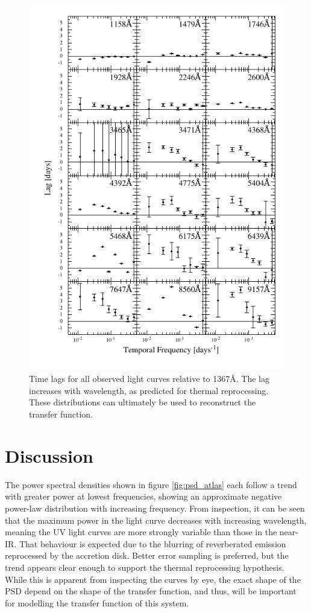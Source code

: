 \documentclass[11pt,letterpaper]{article}
\begin{document}
    \begin{figure}
        \centering
        \includegraphics[width=.9\textwidth]{../img/timelag_atlas.pdf}
        \caption{Time lags for all observed light curves relative to 1367\AA. The lag increases with wavelength, as predicted for thermal reprocessing. These distributions can ultimately be used to reconstruct the transfer function.}
        \label{fig:timelag_atlas}
    \end{figure}

\section{Discussion}
The power spectral densities shown in figure \ref{fig:psd_atlas} each follow a trend with greater power at lowest frequencies, showing an approximate negative power-law distribution with increasing frequency. From inspection, it can be seen that the maximum power in the light curve decreases with increasing wavelength, meaning the UV light curves are more strongly variable than those in the near-IR. That behaviour is expected due to the blurring of reverberated emission reprocessed by the accretion disk. Better error sampling is preferred, but the trend appears clear enough to support the thermal reprocessing hypothesis. While this is apparent from inspecting the curves by eye, the exact shape of the PSD depend on the shape of the transfer function, and thus, will be important for modelling the transfer function of this system.
\end{document}
